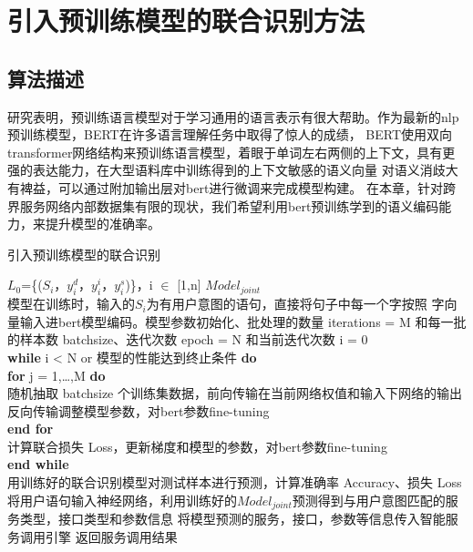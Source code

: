 \chapter{引入预训练模型的联合识别方法}

\section{算法描述}
研究表明，预训练语言模型对于学习通用的语言表示有很大帮助。作为最新的nlp预训练模型，BERT在许多语言理解任务中取得了惊人的成绩，
BERT使用双向transformer网络结构来预训练语言模型，着眼于单词左右两侧的上下文，具有更强的表达能力，在大型语料库中训练得到的上下文敏感的语义向量
对语义消歧大有裨益，可以通过附加输出层对bert进行微调来完成模型构建。
在本章，针对跨界服务网络内部数据集有限的现状，我们希望利用bert预训练学到的语义编码能力，来提升模型的准确率。

\begin{algorithm}
  \caption{引入预训练模型的联合识别}
  \label{alg:suanfa2}
  \begin{algorithmic}[1]
  \Require $L_0$=\{($S_i$，$y_i^d$，$y_i^i$，$y_i^s$)\}，i $\in$ [1,n]
  \Ensure $Model_{joint}$\\
模型在训练时，输入的$S_i$为有用户意图的语句，直接将句子中每一个字按照
字向量输入进bert模型编码。模型参数初始化、批处理的数量
iterations = M 和每一批的样本数 batchsize、迭代次数 epoch = N 和当前迭代次数 i = 0\\
\textbf{while} i < N or 模型的性能达到终止条件 \textbf{do}\\
\qquad \qquad \textbf{for} j = 1,\dots ,M \textbf{do}\\
\qquad \qquad \qquad \qquad 随机抽取 batchsize 个训练集数据，前向传输在当前网络权值和输入下网络的输出\\
\qquad \qquad \qquad \qquad 反向传输调整模型参数，对bert参数fine-tuning\\
\qquad \qquad \textbf{end for}\\
\qquad \qquad 计算联合损失 Loss，更新梯度和模型的参数，对bert参数fine-tuning\\
\textbf{end while}\\
用训练好的联合识别模型对测试样本进行预测，计算准确率 Accuracy、损失 Loss
  \State 将用户语句输入神经网络，利用训练好的$Model_{joint}$预测得到与用户意图匹配的服务类型，接口类型和参数信息
  \State 将模型预测的服务，接口，参数等信息传入智能服务调用引擎
  \State 返回服务调用结果
  \end{algorithmic}
  \end{algorithm}

